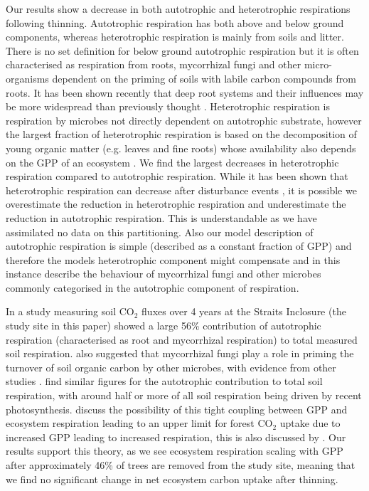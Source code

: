 \documentclass[draft,linenumbers]{agujournal}
\begin{document}
Our results show a decrease in both autotrophic and heterotrophic respirations following thinning. Autotrophic respiration has both above and below ground components, whereas heterotrophic respiration is mainly from soils and litter. There is no set definition for below ground autotrophic respiration but it is often characterised as respiration from roots, mycorrhizal fungi and other micro-organisms dependent on the priming of soils with labile carbon compounds from roots. It has been shown recently that deep root systems and their influences may be more widespread than previously thought \citep{Pierret01102016}. Heterotrophic respiration is respiration by microbes not directly dependent on autotrophic substrate, however the largest fraction of heterotrophic respiration is based on the decomposition of young organic matter (e.g. leaves and fine roots) whose availability also depends on the GPP of an ecosystem \citep{GCB:GCB412}. We find the largest decreases in heterotrophic respiration compared to autotrophic respiration. While it has been shown that heterotrophic respiration can decrease after disturbance events \citep{PCE:PCE1053}, it is possible we overestimate the reduction in heterotrophic respiration and underestimate the reduction in autotrophic respiration. This is understandable as we have assimilated no data on this partitioning. Also our model description of autotrophic respiration is simple (described as a constant fraction of GPP) and therefore the models heterotrophic component might compensate and in this instance describe the behaviour of mycorrhizal fungi and other microbes commonly categorised in the autotrophic component of respiration.   

In a study measuring soil CO\(_{2}\) fluxes over 4 years at the Straits Inclosure (the study site in this paper) \citet{heinemeyer2012exploring} showed a large 56\% contribution of autotrophic respiration (characterised as root and mycorrhizal respiration) to total measured soil respiration. \citet{heinemeyer2012exploring} also suggested that mycorrhizal fungi play a role in priming the turnover of soil organic carbon by other microbes, with evidence from other studies \citep{talbot2008decomposers}. \citet{hogberg2006towards} find similar figures for the autotrophic contribution to total soil respiration, with around half or more of all soil respiration being driven by recent photosynthesis. \citet{heinemeyer2012exploring} discuss the possibility of this tight coupling between GPP and ecosystem respiration leading to an upper limit for forest CO\(_{2}\) uptake due to increased GPP leading to increased respiration, this is also discussed by \citet{heath2005rising}. Our results support this theory, as we see ecosystem respiration scaling with GPP after approximately 46\% of trees are removed from the study site, meaning that we find no significant change in net ecosystem carbon uptake after thinning.   
\end{document}
